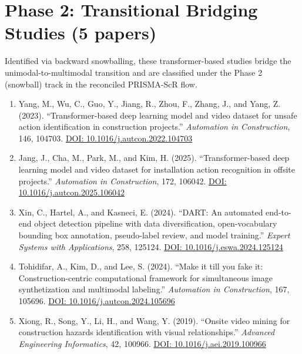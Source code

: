 \documentclass[11pt]{article}
\begin{document}
\section{Phase 2: Transitional Bridging Studies (5 papers)}

Identified via backward snowballing, these transformer-based studies bridge the unimodal-to-multimodal transition and are classified under the Phase 2 (snowball) track in the reconciled PRISMA-ScR flow.

\begin{enumerate}[label=\textbf{T\arabic*.}]

\item Yang, M., Wu, C., Guo, Y., Jiang, R., Zhou, F., Zhang, J., and Yang, Z. (2023). ``Transformer-based deep learning model and video dataset for unsafe action identification in construction projects.'' \textit{Automation in Construction}, 146, 104703. \href{https://doi.org/10.1016/j.autcon.2022.104703}{DOI: 10.1016/j.autcon.2022.104703}

\item Jang, J., Cha, M., Park, M., and Kim, H. (2025). ``Transformer-based deep learning model and video dataset for installation action recognition in offsite projects.'' \textit{Automation in Construction}, 172, 106042. \href{https://doi.org/10.1016/j.autcon.2025.106042}{DOI: 10.1016/j.autcon.2025.106042}

\item Xin, C., Hartel, A., and Kasneci, E. (2024). ``DART: An automated end-to-end object detection pipeline with data diversification, open-vocabulary bounding box annotation, pseudo-label review, and model training.'' \textit{Expert Systems with Applications}, 258, 125124. \href{https://doi.org/10.1016/j.eswa.2024.125124}{DOI: 10.1016/j.eswa.2024.125124}

\item Tohidifar, A., Kim, D., and Lee, S. (2024). ``Make it till you fake it: Construction-centric computational framework for simultaneous image synthetization and multimodal labeling.'' \textit{Automation in Construction}, 167, 105696. \href{https://doi.org/10.1016/j.autcon.2024.105696}{DOI: 10.1016/j.autcon.2024.105696}

\item Xiong, R., Song, Y., Li, H., and Wang, Y. (2019). ``Onsite video mining for construction hazards identification with visual relationships.'' \textit{Advanced Engineering Informatics}, 42, 100966. \href{https://doi.org/10.1016/j.aei.2019.100966}{DOI: 10.1016/j.aei.2019.100966}

\end{enumerate}
\end{document}

